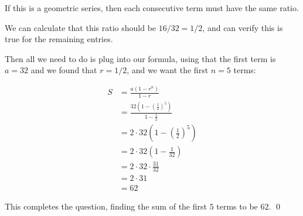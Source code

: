 \begin{solution}
    If this is a geometric series, then each consecutive term must have the same ratio.

    We can calculate that this ratio should be $16/32 = 1/2$, and can verify this is true for the remaining entries.

    Then all we need to do is plug into our formula, using that the first term is $a = 32$ and we found that $r = 1/2$, and we want the first $n= 5$ terms:

    \begin{align*}
    S &= \frac{a(1 - r^{n})}{1-r} \\
      &= \frac{32\left(1 - \left(\frac{1}{2}\right)^5\right)}{1-\frac{1}{2}} \\
      &= 2\cdot 32\left(1 - \left(\frac{1}{2}\right)^5\right) \\
      &= 2\cdot 32\left(1 - \frac{1}{32}\right) \\
      &= 2\cdot 32\cdot \frac{31}{32} \\
      &= 2\cdot 31 \\
      &= 62
\end{align*}


    This completes the question, finding the sum of the first $5$ terms to be $62$.
    \qed
\end{solution}





